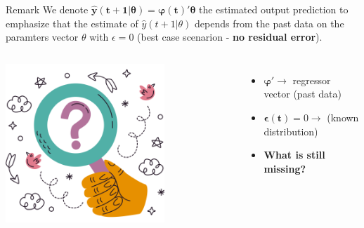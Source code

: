 \documentclass[aspectratio=169,hyperref={pdfpagelabels=false}]{beamer}
\begin{document}
\begin{frame}{}
  \begin{block}{Remark}
    We denote $\bm{\hat{y}(t+1|\theta) = \varphi(t)'\theta}$ the estimated output prediction
  to emphasize that the estimate of $\hat{y}(t+1|\theta)$ depends from the past data on the paramters vector $\theta$ with $\epsilon=0$ (best case scenarion - \textbf{no residual error}).
  \end{block}\pause
  
  \vspace{2em}  
  \begin{columns}
     \includegraphics[width=0.7\textwidth]{img/pic5.png} \centering \pause
    \begin{itemize}
      \item $\bm{\varphi}' \rightarrow$ regressor vector (past data)
      \item $\bm{\epsilon(t)} = 0 \rightarrow $ (known distribution)
      \item[] \vspace{2em} \hspace{2em}\textbf{What is still missing?}   \pause
    \end{itemize}
    \end{columns}
\end{frame}
\end{document}
